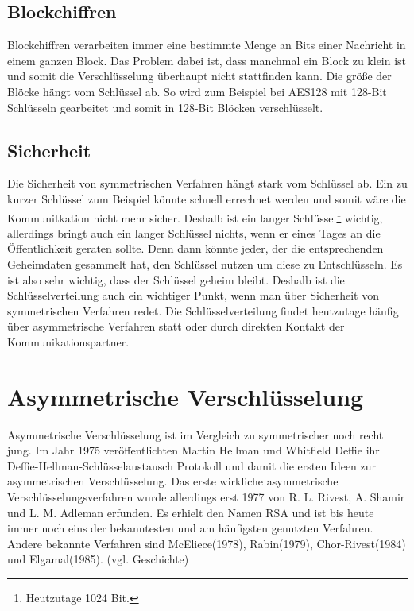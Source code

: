 \documentclass[a4paper,12pt,titlepage]{article}
\begin{document}
\subsection{Blockchiffren}
Blockchiffren verarbeiten immer eine bestimmte Menge an Bits einer Nachricht in einem ganzen Block. Das Problem dabei ist, dass manchmal ein Block zu klein ist und somit die Verschlüsselung überhaupt nicht stattfinden kann. Die größe der Blöcke hängt vom Schlüssel ab. So wird zum Beispiel bei AES128 mit 128-Bit Schlüsseln gearbeitet und somit in 128-Bit Blöcken verschlüsselt.

\subsection{Sicherheit}\label{symm:secu}
Die Sicherheit von symmetrischen Verfahren hängt stark vom Schlüssel ab. Ein zu kurzer Schlüssel zum Beispiel könnte schnell errechnet werden und somit wäre die Kommunitkation nicht mehr sicher. Deshalb ist ein langer Schlüssel\footnote{Heutzutage 1024 Bit.} wichtig, allerdings bringt auch ein langer Schlüssel nichts, wenn er eines Tages an die Öffentlichkeit geraten sollte. Denn dann könnte jeder, der die entsprechenden Geheimdaten gesammelt hat, den Schlüssel nutzen um diese zu Entschlüsseln. Es ist also sehr wichtig, dass der Schlüssel geheim bleibt. Deshalb ist die Schlüsselverteilung auch ein wichtiger Punkt, wenn man über Sicherheit von symmetrischen Verfahren redet. Die Schlüsselverteilung findet heutzutage häufig über asymmetrische Verfahren statt oder durch direkten Kontakt der Kommunikationspartner.

\section{Asymmetrische Verschlüsselung}\label{asymm}
Asymmetrische Verschlüsselung ist im Vergleich zu symmetrischer noch recht jung. Im Jahr 1975 veröffentlichten Martin Hellman und Whitfield Deffie ihr Deffie-Hellman-Schlüsselaustausch Protokoll und damit die ersten Ideen zur asymmetrischen Verschlüsselung. Das erste wirkliche asymmetrische Verschlüsselungsverfahren wurde allerdings erst 1977 von R. L. Rivest, A. Shamir und L. M. Adleman erfunden. Es erhielt den Namen RSA und ist bis heute immer noch eins der bekanntesten und am häufigsten genutzten Verfahren. Andere bekannte Verfahren sind McEliece(1978), Rabin(1979), Chor-Rivest(1984) und Elgamal(1985). (vgl. \cite{asymm_gesch} Geschichte)
\end{document}
